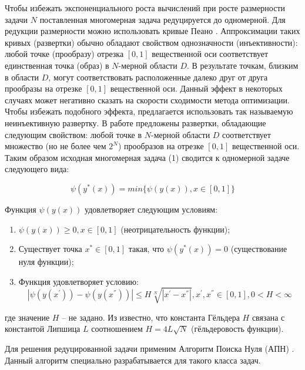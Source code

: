 \documentclass[11pt, oneside, a4paper]{article}
\begin{document}
Чтобы избежать экспоненциального роста вычислений при росте размерности задачи $N$ поставленная многомерная задача редуцируется до одномерной. Для редукции размерности можно использовать кривые Пеано \cite{Strongin1,Strongin2}. Аппроксимации таких кривых (развертки) обычно обладают свойством однозначности (инъективности): любой точке (прообразу) отрезка $[0,1]$ вещественной оси соответствует единственная точка (образ) в $N$-мерной области $D$. В результате точкам, близким в области $D$, могут соответствовать расположенные далеко друг от друга  прообразы на отрезке $[0,1]$ вещественной оси. Данный эффект в некоторых случаях может негативно сказать на скорости сходимости метода оптимизации. Чтобы избежать подобного эффекта, предлагается использовать так называемую неинъективную развертку. В работе \cite{Sergeyev} предложены развертки, обладающие следующим свойством: любой точке в $N$-мерной области $D$ соответствует множество (но не более чем $2^{N}$) прообразов на отрезке $[0,1]$ вещественной оси. Таким образом исходная многомерная задача (1) сводится к одномерной задаче следующего вида:

\[
\psi(y^{*}(x))=min\{\psi(y(x)),x\in [0,1]\}\tag{2}
\]

Функция $\psi(y(x))$ удовлетворяет следующим условиям:

\begin{enumerate}
	\item $\psi(y(x))\geq 0, x\in [0,1]$ (неотрицательность функции);
  \item Существует точка $x^{*}\in [0,1]$ такая, что $\psi(y^{*}(x))=0$ (существование нуля функции);
	\item Функция удовлетворяет условию: \[\left|\psi(y(x^{'})) - \psi(y(x^{''})) \right| \leq H \sqrt[N]{\left| x^{'} - x^{''} \right|} ,x^{'},x^{''}\in [0,1], 0<H<\infty\]
\end{enumerate}
где значение $H$ – не задано. Из \cite{Strongin2} известно, что константа Гёльдера $H$ связана с константой Липшица $L$ соотношением $H=4L\sqrt{N}$ (гёльдеровость функции).

Для решения редуцированной задачи применим Алгоритм Поиска Нуля (АПН) \cite{Zaitsev,Barkalov2}. Данный алгоритм специально разрабатывается для такого класса задач.
\end{document}
